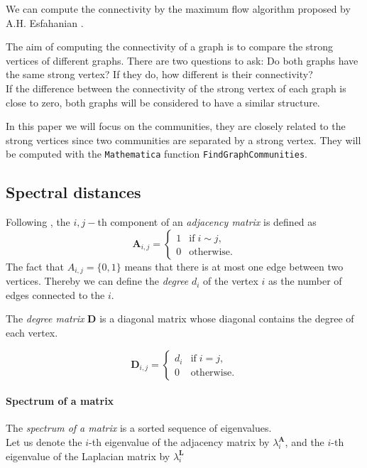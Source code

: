 \documentclass[english, 12pt]{article}
\begin{document}
We can compute the connectivity by the maximum flow algorithm proposed by A.H. Esfahanian \cite[Algorithm 11]{2013Esfahanian}.

The aim of computing the connectivity of a graph is to compare the strong vertices of different graphs. There are two questions to ask:
Do both graphs have the same strong vertex? If they do, how different is their connectivity?\\
If the difference between the connectivity of the strong vertex of each graph is close to zero, both graphs will be considered to have a similar structure.

In this paper we will focus on the communities, they are closely related to the strong vertices since two communities are separated by a strong vertex. They will be computed with the \texttt{Mathematica} function \texttt{FindGraphCommunities}.

\subsection{Spectral distances}

Following \cite{2020Wills}, the $i,j-$th component of an {\it adjacency matrix} is defined as
$$\mathbf A_{i,j} = \begin{cases}1&\text{if}\; i\sim j,\\0&\text{otherwise.}\end{cases}$$
The fact that $A_{i,j} = \{0,1\}$ means that there is at most one edge between two vertices. Thereby we can define the {\it degree} $d_i$ of the vertex $i$ as the number of edges connected to the $i$.

The {\it degree matrix} $\mathbf D$ is a diagonal matrix whose diagonal contains the degree of each vertex.

$$\mathbf D_{i,j} =  \begin{cases}d_i&\text{if}\; i = j,\\0&\text{otherwise.}\end{cases}$$

\paragraph{Spectrum of a matrix}

The {\it spectrum of a matrix} is a sorted sequence of eigenvalues.\\
Let us denote the $i$-th eigenvalue of the adjacency matrix by $\lambda_i^{\mathbf A}$, and the $i$-th eigenvalue of the Laplacian matrix by $\lambda_i^{\mathbf L}$
\end{document}
